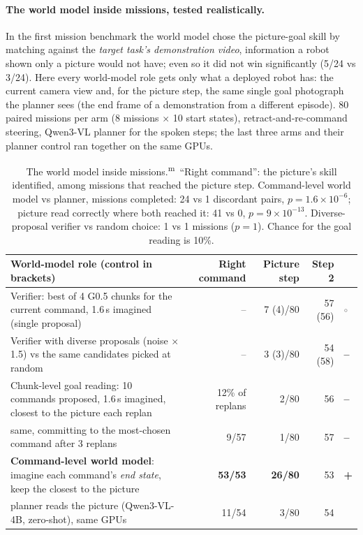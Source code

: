 \documentclass[10pt,a4paper]{article}
\DeclareRobustCommand{\meas}{\textsuperscript{\textcolor{green!50!black}{m}}}
\newcommand{\pos}{\textcolor{green!45!black}{\textbf{+}}}
\newcommand{\negr}{\textcolor{red!70!black}{\textbf{--}}}
\newcommand{\neu}{\textcolor{gray}{$\circ$}}
\begin{document}
\paragraph{The world model inside missions, tested realistically.} In the first mission benchmark the world model chose the picture-goal skill by matching against the \emph{target task's demonstration video}, information a robot shown only a picture would not have; even so it did not win significantly (5/24 vs 3/24). Here every world-model role gets only what a deployed robot has: the current camera view and, for the picture step, the same single goal photograph the planner sees (the end frame of a demonstration from a different episode). 80 paired missions per arm (8 missions $\times$ 10 start states), retract-and-re-command steering, Qwen3-VL planner for the spoken steps; the last three arms and their planner control ran together on the same GPUs.
\begin{table}[H]\centering\small
\setlength{\tabcolsep}{4pt}
\begin{tabularx}{\textwidth}{Yrrrl}
\toprule
World-model role (control in brackets) & Right command & Picture step & Step 2 & \\
\midrule
Verifier: best of 4 G0.5 chunks for the current command, 1.6\,s imagined (single proposal) & -- & 7 (4)/80 & 57 (56) & \neu\\
Verifier with diverse proposals (noise $\times$1.5) vs the same candidates picked at random & -- & 3 (3)/80 & 54 (58) & \negr\\
Chunk-level goal reading: 10 commands proposed, 1.6\,s imagined, closest to the picture each replan & 12\% of replans & 2/80 & 56 & \negr\\
\quad same, committing to the most-chosen command after 3 replans & 9/57 & 1/80 & 57 & \negr\\
\textbf{Command-level world model}: imagine each command's \emph{end state}, keep the closest to the picture & \textbf{53/53} & \textbf{26/80} & 53 & \pos\\
\quad planner reads the picture (Qwen3-VL-4B, zero-shot), same GPUs & 11/54 & 3/80 & 54 & \\
\bottomrule
\end{tabularx}
\caption{The world model inside missions.\meas\ ``Right command'': the picture's skill identified, among missions that reached the picture step. Command-level world model vs planner, missions completed: 24 vs 1 discordant pairs, $p=1.6\times10^{-6}$; picture read correctly where both reached it: 41 vs 0, $p=9\times10^{-13}$. Diverse-proposal verifier vs random choice: 1 vs 1 missions ($p=1$). Chance for the goal reading is 10\%.}
\label{tab:wm-missions}
\end{table}
\end{document}
